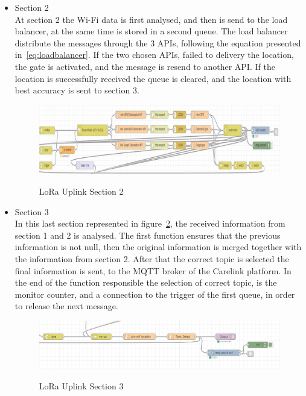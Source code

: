 \begin{itemize}
\begin{itemize}
  \item Section 2\\
    At section 2 the Wi-Fi data is first analysed, and then is send to the load balancer, at the same time is stored in a second queue. The load balancer distribute the messages through the 3 APIs, following the equation presented in~\ref{eq:loadbalancer}. If the two chosen APIs, failed to delivery the location, the gate is activated, and the message is resend to another API. If the location is successfully received the queue is cleared, and the location with best accuracy is sent to section 3.
    \begin{figure}[htbp]
      \centering
     
        {\includegraphics[width=\linewidth]{Chapters/Figures/sec2.png}}
    
      \caption{LoRa Uplink  Section 2}
      \label{fig:LoRa_Uplink_Sec2}
    \end{figure}
\end{itemize}

\begin{itemize}
  \item Section 3\\
  In this last section represented in figure~\ref{fig:LoRa_Uplink_Sec3}, the received information from section 1 and 2 is analysed. The first function ensures that the previous information is not null, then the original information is merged together with the information from section 2. After that the correct topic is selected  the final information is sent, to the MQTT broker of the Carelink platform. In the end of the function responsible the selection of correct topic, is the monitor counter, and a connection to the trigger of the first queue, in order to release the next message.
  
    \begin{figure}[htbp]
      \centering
    
        {\includegraphics[width=\linewidth]{Chapters/Figures/section3.JPG}}
     
      \caption{LoRa Uplink Section 3}
      \label{fig:LoRa_Uplink_Sec3}
    \end{figure}
\end{itemize}

\end{itemize}


